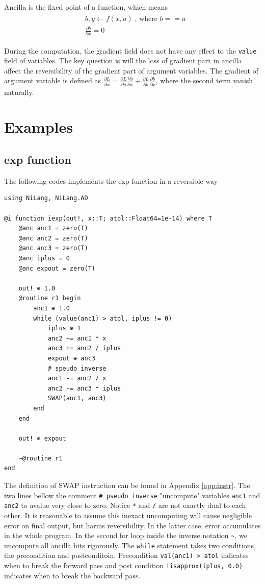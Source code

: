 \documentclass[aps,twocolumn,longbibliography,english,superscriptaddress,prr]{revtex4-1}
\newcommand{\<}{\langle}
\renewcommand{\>}{\rangle}
\newcommand{\App}[1]{Appendix \ref{#1}}
\begin{document}
Ancilla is the fixed point of a function, which means 
\begin{align}
    \begin{split}
    &b, y \leftarrow f(x, a)\; \text{, where } b==a\\
    &\frac{\partial b}{\partial x} = 0
    \end{split}
\end{align}

During the computation, the gradient field does not have any effect to the \texttt{value} field of variables. The key question is will the loss of gradient part in ancilla affect the reversibility of the gradient part of argument variables.
The gradient of argument variable is defined as $\frac{\partial L}{\partial x} = \frac{\partial L}{\partial y}\frac{\partial y}{\partial x} + \frac{\partial L}{\partial b}\frac{\partial b}{\partial x}$, where the second term vanish naturally.

\section{Examples}
\subsection{exp function}
The following codes implements the exp function in a reversible way

\begin{minipage}{.44\textwidth}
\begin{lstlisting}
using NiLang, NiLang.AD

@i function iexp(out!, x::T; atol::Float64=1e-14) where T
    @anc anc1 = zero(T)
    @anc anc2 = zero(T)
    @anc anc3 = zero(T)
    @anc iplus = 0
    @anc expout = zero(T)

    out! ⊕ 1.0
    @routine r1 begin
        anc1 ⊕ 1.0
        while (value(anc1) > atol, iplus != 0)
            iplus ⊕ 1
            anc2 += anc1 * x
            anc3 += anc2 / iplus
            expout ⊕ anc3
            # speudo inverse
            anc1 -= anc2 / x
            anc2 -= anc3 * iplus
            SWAP(anc1, anc3)
        end
    end

    out! ⊕ expout

    ~@routine r1
end
\end{lstlisting}
\end{minipage}

The definition of SWAP instruction can be found in \App{app:instr}.
The two lines bellow the comment \texttt{\# pseudo inverse} "uncompute" variables \texttt{anc1} and \texttt{anc2} to avalue very close to zero. Notice \texttt{*} and \texttt{/} are not exactly dual to each other.
It is reasonable to assume this inexact uncomputing will cause negligible error on final output, but harms reversibility. In the latter case, error accumulates in the whole program.
In the second for loop inside the inverse notation \texttt{\~}, we uncompute all ancilla bits rigorously.
The \texttt{while} statement takes two conditions, the precondition and postconditoin. Precondition \texttt{val(anc1) > atol} indicates when to break the forward pass and post condition \texttt{!isapprox(iplus, 0.0)} indicates when to break the backward pass.
\end{document}
